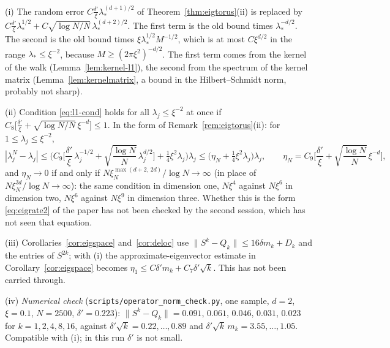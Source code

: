 \begin{remark}\label{rem:eigtorus-l1}
(i) The random error $C\frac{\delta'}\xi\lambda_*^{(d+1)/2}$ of Theorem~\ref{thm:eigtorus}(ii) is replaced
by $C\frac{\delta'}\xi\lambda_*^{1/2}+C\sqrt{\log N/N}\,\lambda_*^{(d+2)/2}$. The first term is the old bound
times $\lambda_*^{-d/2}$. The second is the old bound times $\xi\lambda_*^{1/2}M^{-1/2}$, which is at most
$C\xi^{d/2}$ in the range $\lambda_*\le\xi^{-2}$, because $M\ge(2\pi\xi^2)^{-d/2}$. The first term comes from the kernel of the
walk (Lemma~\ref{lem:kernel-l1}), the second from the spectrum of the kernel matrix
(Lemma~\ref{lem:kernelmatrix}, a bound in the Hilbert--Schmidt norm, probably not sharp).

(ii) Condition \eqref{eq:l1-cond} holds for all $\lambda_j\le\xi^{-2}$ at once if
$C_8\big[\frac{\delta'}\xi+\sqrt{\log N/N}\,\xi^{-d}\big]\le1$. In the form of
Remark~\ref{rem:eigtorus}(ii): for $1\le\lambda_j\le\xi^{-2}$,
\[
 |\lambda^N_j-\lambda_j|\le\Big(C_9\Big[\frac{\delta'}\xi\,\lambda_j^{-1/2}+\sqrt{\frac{\log N}N}\,\lambda_j^{d/2}\Big]
 +\tfrac14\xi^2\lambda_j\Big)\lambda_j\le\big(\eta_N+\tfrac14\xi^2\lambda_j\big)\lambda_j,\qquad
 \eta_N=C_9\Big[\frac{\delta'}\xi+\sqrt{\frac{\log N}N}\,\xi^{-d}\Big],
\]
and $\eta_N\to0$ if and only if $N\xi_N^{\max(d+2,\,2d)}/\log N\to\infty$ (in place of
$N\xi_N^{3d}/\log N\to\infty$): the same condition in dimension one, $N\xi^4$ against $N\xi^6$ in dimension
two, $N\xi^6$ against $N\xi^9$ in dimension three. Whether this is the form \eqref{eq:eigrate2} of the
paper has not been checked by the second session, which has not seen that equation.

(iii) Corollaries~\ref{cor:eigspace} and~\ref{cor:deloc} use $\|S^k-Q_k\|\le16\delta m_k+D_k$ and the
entries of $S^{2k}$; with (i) the approximate-eigenvector estimate in Corollary~\ref{cor:eigspace} becomes
$\eta_1\le C\delta'm_k+C_7\delta'\sqrt k$. This has not been carried through.

(iv) \emph{Numerical check} (\texttt{scripts/operator\_norm\_check.py}, one sample, $d=2$, $\xi=0.1$,
$N=2500$, $\delta'=0.223$): $\|S^k-Q_k\|=0.091$, $0.061$, $0.046$, $0.031$, $0.023$ for $k=1,2,4,8,16$,
against $\delta'\sqrt k=0.22,\dots,0.89$ and $\delta'\sqrt k\,m_k=3.55,\dots,1.05$. Compatible with (i); in
this run $\delta'$ is not small.
\end{remark}
